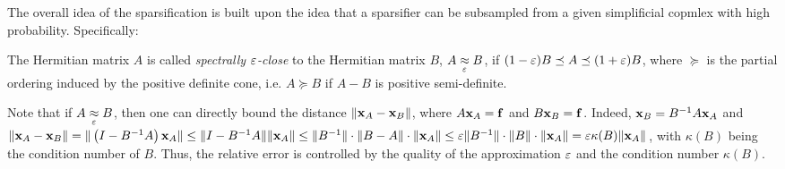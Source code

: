\documentclass{mynotes}
\begin{document}
The overall idea of the sparsification is built upon the idea that a sparsifier can be subsampled from a given simplificial copmlex with high probability. Specifically: 
\begin{definition}
      The Hermitian matrix \( A \) is called \emph{spectrally \(\varepsilon\)-close} to the Hermitian matrix \( B \), \( A \underset{\varepsilon}{\approx} B \), if 
            $( 1 - \varepsilon ) B \preceq A \preceq ( 1 + \varepsilon ) B $,
      where \( \succeq \) is the partial ordering induced by the positive definite cone, i.e. \( A \succeq B \) if \( A - B \) is positive semi-definite.
\end{definition}

\begin{remark}\label{rem:approx_error}
      Note that if \( A \underset{\varepsilon}{\approx} B \), then one can directly bound the distance \( \| \mathbf{x}_A - \mathbf{x}_B \| \), where \( A \mathbf{x}_A = \mathbf{f} \) and \( B \mathbf{x}_B = \mathbf{f}\). Indeed, \( \mathbf{x}_B = B^{-1} A \mathbf{x}_A \) and \(\| \mathbf{x}_A - \mathbf{x}_B \| = \| \left( I - B^{-1}A \right) \mathbf{x}_A \| \le \| I - B^{-1}A \| \| \mathbf{x}_A \| \le  \| B^{-1} \| \cdot \| B - A \| \cdot \| \mathbf{x}_A \| \le \varepsilon \| B^{-1} \| \cdot \| B \| \cdot \| \mathbf{x}_A \| = \varepsilon \kappa(B) \| \mathbf{x}_A \| \), with \( \kappa(B) \) being the condition number of \( B \). Thus, the relative error is controlled by the quality of the approximation \( \varepsilon \) and the condition number \( \kappa(B )\). %
\end{remark}
\end{document}
